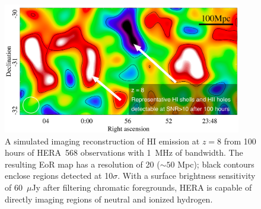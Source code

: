 \documentclass[preprint]{aastex}
\def\HI{{H{\small I }}}
\begin{document}

\begin{figure}[t] \centering
\includegraphics[height=2.25in]{plots/HERA_z8_SNR_wide_annotated.jpg}
\caption{\small 
A simulated imaging reconstruction of \HI emission at $z=8$ from 
100 hours of HERA~568 observations with 1~MHz of bandwidth.  The resulting
EoR map has a resolution of 20\arcmin 
($\sim50$ Mpc); black contours
enclose regions detected at 10$\sigma$.
With a surface brightness sensitivity of 60~$\mu$Jy after filtering chromatic
foregrounds, HERA is capable of
directly imaging regions of neutral and ionized hydrogen.
\label{imaging}}
\end{figure}
\end{document}
